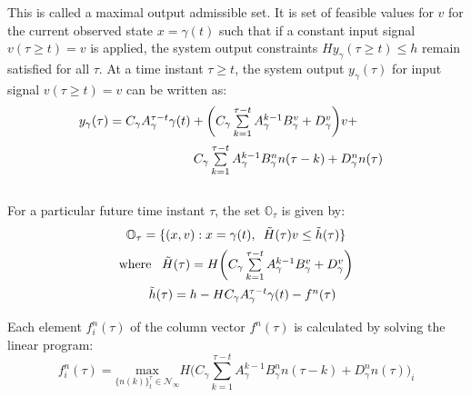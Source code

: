 \documentclass[letterpaper, 10 pt, conference]{ieeeconf}  %
\begin{document}
	This is called a maximal output admissible set.
	It is set of feasible values for $v$ for the current observed state $x=\gamma(t)$ such that if a constant input signal $v(\tau \geq t)=v$ is applied, the system output constraints $Hy_{\gamma}(\tau \geq t) \leq h$ remain satisfied for all $\tau$.
	At a time instant $\tau \geq t$, the system output $y_{\gamma}(\tau)$ for input signal $v(\tau \geq t)=v$ can be written as:
	\begin{equation*}
	\hspace{-30pt}
	\begin{aligned}
	\begin{matrix}
	y_{\gamma}(\tau) = C_{\gamma}A_{\gamma}^{\tau - t}\gamma(t) + \bigg( C_{\gamma}\sum\limits_{k=1}^{\tau - t}A_{\gamma}^{k-1}B^v_{\gamma} + D_{\gamma}^v \bigg)v + \vspace{5pt}\\  \hspace{110pt} C_{\gamma}\sum\limits_{k=1}^{\tau - t}A_{\gamma}^{k-1}B^n_{\gamma}n(\tau-k) + D_{\gamma}^n n(\tau)
	\end{matrix}
	\end{aligned}
	\end{equation*} \\
	For a particular future time instant $\tau$, the set $\mathbb{O}_{\tau}$ is given by:
	\begin{equation*}
	\begin{matrix}
	\mathbb{O}_{\tau} = \{(x,v): x = \gamma(t), \hspace{5pt} \tilde{H}(\tau)v \leq \tilde{h}(\tau)\} \vspace{5pt}\\
	\text{where } \hspace{5pt} \tilde{H}(\tau) = H\bigg( C_{\gamma}\sum\limits_{k=1}^{\tau - t}A_{\gamma}^{k-1}B^v_{\gamma} + D_{\gamma}^v \bigg) \vspace{5pt} \\ \hspace{10pt}
	\tilde{h}(\tau) = h - HC_{\gamma}A_{\gamma}^{\tau - t}\gamma(t) - f^n(\tau) \vspace{5pt}
	\end{matrix} 
	\end{equation*}
	Each element $f^n_i(\tau)$ of the column vector $f^n(\tau)$ is calculated by solving the linear program:
	\begin{equation}
	f_i^n(\tau) = \underset{\{n(k)\}_{t}^{\tau}\in \mathcal{N}_{\infty}}{\text{max}} H\bigg(C_{\gamma}\sum\limits_{k=1}^{\tau - t}A_{\gamma}^{k-1}B^n_{\gamma}n(\tau-k) + D_{\gamma}^n n(\tau)\bigg)_i
	\label{RG_offline}
	\end{equation}
\end{document}
